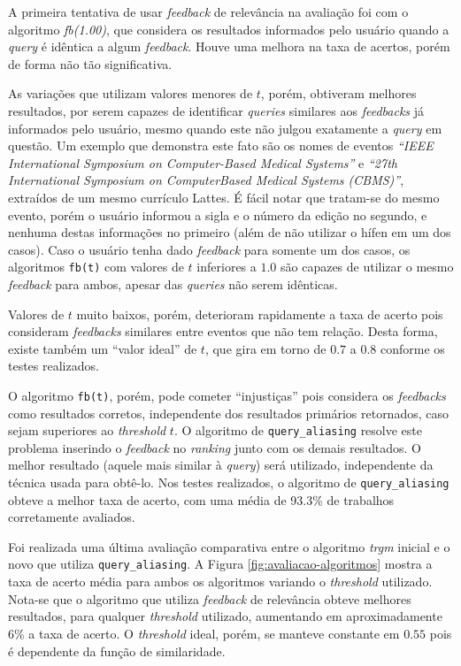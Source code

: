 \documentclass[12pt]{article}
\newcommand{\quotes}[1]{``#1''}
\begin{document}
A primeira tentativa de usar \textit{feedback} de relevância na avaliação foi com o algoritmo \textit{fb(1.00)}, que considera os resultados informados pelo usuário quando a \textit{query} é idêntica a algum \textit{feedback}. Houve uma melhora na taxa de acertos, porém de forma não tão significativa.

As variações que utilizam valores menores de $t$, porém, obtiveram melhores resultados, por serem capazes de identificar \textit{queries} similares aos \textit{feedbacks} já informados pelo usuário, mesmo quando este não julgou exatamente a \textit{query} em questão. Um exemplo que demonstra este fato são os nomes de eventos \textit{\quotes{IEEE International Symposium on Computer-Based Medical Systems}} e \textit{\quotes{27th International Symposium on ComputerBased Medical Systems (CBMS)}}, extraídos de um mesmo currículo Lattes. É fácil notar que tratam-se do mesmo evento, porém o usuário informou a sigla e o número da edição no segundo, e nenhuma destas informações no primeiro (além de não utilizar o hífen em um dos casos). Caso o usuário tenha dado \textit{feedback} para somente um dos casos, os algoritmos \texttt{fb(t)} com valores de $t$ inferiores a $1.0$ são capazes de utilizar o mesmo \textit{feedback} para ambos, apesar das \textit{queries} não serem idênticas.

Valores de $t$ muito baixos, porém, deterioram rapidamente a taxa de acerto pois consideram \textit{feedbacks} similares entre eventos que não tem relação. Desta forma, existe também um \quotes{valor ideal} de $t$, que gira em torno de $0.7$ a $0.8$ conforme os testes realizados.

O algoritmo \texttt{fb(t)}, porém, pode cometer \quotes{injustiças} pois considera os \textit{feedbacks} como resultados corretos, independente dos resultados primários retornados, caso sejam superiores ao \textit{threshold} $t$. O algoritmo de \texttt{query\_aliasing} resolve este problema inserindo o \textit{feedback} no \textit{ranking} junto com os demais resultados. O melhor resultado (aquele mais similar à \textit{query}) será utilizado, independente da técnica usada para obtê-lo. Nos testes realizados, o algoritmo de \texttt{query\_aliasing} obteve a melhor taxa de acerto, com uma média de 93.3\% de trabalhos corretamente avaliados.

Foi realizada uma última avaliação comparativa entre o algoritmo \textit{trgm} inicial e o novo que utiliza \texttt{query\_aliasing}. A Figura \ref{fig:avaliacao-algoritmos} mostra a taxa de acerto média para ambos os algoritmos variando o \textit{threshold} utilizado. Nota-se que o algoritmo que utiliza \textit{feedback} de relevância obteve melhores resultados, para qualquer \textit{threshold} utilizado, aumentando em aproximadamente 6\% a taxa de acerto. O \textit{threshold} ideal, porém, se manteve constante em $0.55$ pois é dependente da função de similaridade.
\end{document}
